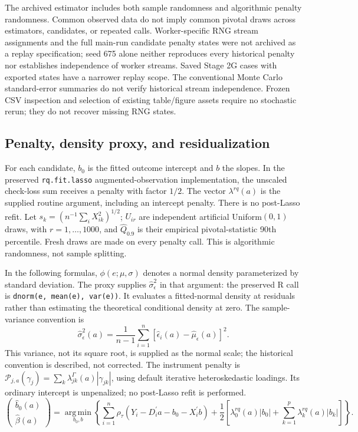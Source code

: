 The archived estimator includes both sample randomness and algorithmic penalty randomness. Common observed data do not imply common pivotal draws across estimators, candidates, or repeated calls. Worker-specific RNG stream assignments and the full main-run candidate penalty states were not archived as a replay specification; seed 675 alone neither reproduces every historical penalty nor establishes independence of worker streams. Saved Stage 2G cases with exported states have a narrower replay scope. The conventional Monte Carlo standard-error summaries do not verify historical stream independence. Frozen CSV inspection and selection of existing table/figure assets require no stochastic rerun; they do not recover missing RNG states.

\subsection{Penalty, density proxy, and residualization}
\label{app:penalty-implementation}
For each candidate, $b_0$ is the fitted outcome intercept and $b$ the slopes. In the preserved \texttt{rq.fit.lasso} augmented-observation implementation, the unscaled check-loss sum receives a penalty with factor $1/2$. The vector $\lambda^{rq}(a)$ is the supplied routine argument, including an intercept penalty. There is no post-Lasso refit. Let $s_k=(n^{-1}\sum_iX_{ik}^2)^{1/2}$; $U_{ir}$ are independent artificial Uniform$(0,1)$ draws, with $r=1,\ldots,1000$, and $\widehat Q_{0.9}$ is their empirical pivotal-statistic 90th percentile. Fresh draws are made on every penalty call. This is algorithmic randomness, not sample splitting.

In the following formulas, $\phi(e;\mu,\sigma)$ denotes a normal density parameterized by standard deviation. The proxy supplies $\widehat\sigma_\epsilon^2$ in that argument: the preserved R call is \texttt{dnorm(e, mean(e), var(e))}. It evaluates a fitted-normal density at residuals rather than estimating the theoretical conditional density at zero. The sample-variance convention is
\[
 \widehat\sigma_\epsilon^2(a)=\frac{1}{n-1}\sum_{i=1}^n
 \left[\widehat\epsilon_i(a)-\widehat\mu_\epsilon(a)\right]^2.
\]
This variance, not its square root, is supplied as the normal scale; the historical convention is described, not corrected. The instrument penalty is $\mathcal P_{j,a}(\gamma_j)=\sum_k\lambda^\Gamma_{jk}(a)|\gamma_{jk}|$, using default iterative heteroskedastic loadings. Its ordinary intercept is unpenalized; no post-Lasso refit is performed.
\begin{equation}
    \begin{pmatrix}
        \widehat b_0(a)\\
        \widehat\beta(a)
    \end{pmatrix}
    =
    \operatorname*{arg\,min}_{b_0,b}
    \left\{
        \sum_{i=1}^{n}
        \rho_{\tau}\!\left(
            Y_i-D_i^{\prime}a-b_0-X_i^{\prime}b
        \right)
        +
        \frac{1}{2}\left[
            \lambda_0^{rq}(a)|b_0|
            +\sum_{k=1}^{p}\lambda_k^{rq}(a)|b_k|
        \right]
    \right\}.
    \label{eq:beta-hat-dml}
\end{equation}

